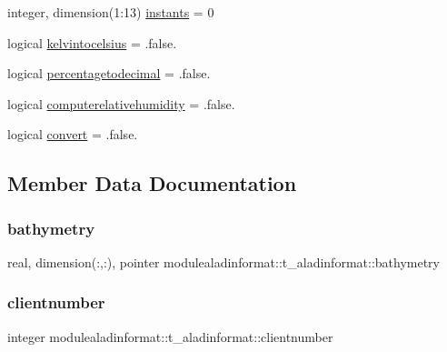 \begin{DoxyCompactItemize}
\item 
integer, dimension(1\+:13) \mbox{\hyperlink{structmodulealadinformat_1_1t__aladinformat_a2b86ddec5abfee6f70cadef52abea6ca}{instants}} = 0
\item 
logical \mbox{\hyperlink{structmodulealadinformat_1_1t__aladinformat_a93d434916fa0afc1831921e809650aeb}{kelvintocelsius}} = .false.
\item 
logical \mbox{\hyperlink{structmodulealadinformat_1_1t__aladinformat_abc65d9292cf9e168780e0419c2e89f5b}{percentagetodecimal}} = .false.
\item 
logical \mbox{\hyperlink{structmodulealadinformat_1_1t__aladinformat_ab94c866476876e3145fdfdcd019f1e7b}{computerelativehumidity}} = .false.
\item 
logical \mbox{\hyperlink{structmodulealadinformat_1_1t__aladinformat_a56c16e38d1fe8d55dc4694eec256ac96}{convert}} = .false.
\end{DoxyCompactItemize}


\subsection{Member Data Documentation}
\mbox{\label{structmodulealadinformat_1_1t__aladinformat_a823a69d9a60f96c009f75c96bb447eb2}} 
\subsubsection{\texorpdfstring{bathymetry}{bathymetry}}
{\footnotesize\ttfamily real, dimension(\+:,\+:), pointer modulealadinformat\+::t\+\_\+aladinformat\+::bathymetry\hspace{0.3cm}{\ttfamily [private]}}

\mbox{\label{structmodulealadinformat_1_1t__aladinformat_ad708bb5dcdf6e5ca5357001efd0acb25}} 
\subsubsection{\texorpdfstring{clientnumber}{clientnumber}}
{\footnotesize\ttfamily integer modulealadinformat\+::t\+\_\+aladinformat\+::clientnumber\hspace{0.3cm}{\ttfamily [private]}}


